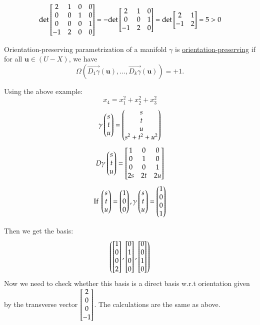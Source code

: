 \[\mathrm{det} \begin{bmatrix} 2 & 1 & 0 & 0 \\ 0 & 0 & 1 & 0 \\ 0 & 0 & 0 & 1 \\ -1 & 2 & 0 & 0 \end{bmatrix}=-\mathrm{det} \begin{bmatrix} 2 & 1 & 0 \\ 0 & 0 & 1 \\ -1 & 2 & 0 \end{bmatrix}=\mathrm{det}\begin{bmatrix} 2 & 1 \\ -1 & 2 \end{bmatrix}=5>0\]

\begin{defn}{Orientation-preserving parametrization of a manifold}
	$\gamma$ is \ul{orientation-preserving} if for all $\bm{u}\in (U-X)$, we have
	\begin{equation}
		\Omega(\overrightarrow{D_1\gamma} (\bm{u}),\dots, \overrightarrow{D_k\gamma}(\bm{u}))=+1.
	\end{equation}
\end{defn}

Using the above example: 
\[x_4=x_1^2 + x_2^2 + x_3^2\]
\[\gamma\begin{pmatrix} s \\ t \\ u \end{pmatrix} = \begin{pmatrix} s \\ t \\ u \\ s^2+t^2+u^2 \end{pmatrix}\]
\[D\gamma\begin{pmatrix} s \\ t \\ u \end{pmatrix} = \begin{bmatrix} 1 & 0 & 0 \\ 0 & 1 & 0 \\ 0 & 0 & 1 \\ 2s & 2t & 2u \end{bmatrix}\]
\[\text{If }\begin{pmatrix} s \\ t \\ u \end{pmatrix} = \begin{pmatrix} 1 \\ 0 \\ 0 \end{pmatrix}, \gamma\begin{pmatrix} s \\ t \\ u \end{pmatrix} = \begin{pmatrix} 1 \\ 0 \\ 0 \\ 1 \end{pmatrix}\]

Then we get the basis: 
\[\left( \begin{bmatrix} 1 \\ 0 \\ 0 \\ 2 \end{bmatrix},\begin{bmatrix} 0 \\ 1 \\ 0 \\ 0 \end{bmatrix}, \begin{bmatrix} 0 \\ 0 \\ 1 \\ 0 \end{bmatrix} \right)\]
Now we need to check whether this basis is a direct basis w.r.t orientation given by the transverse vector $\begin{bmatrix} 2 \\ 0 \\ 0 \\ -1 \end{bmatrix}$. The calculations are the same as above. 

